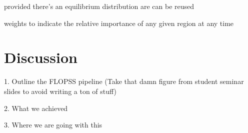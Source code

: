 \documentclass{biophys-new}
\begin{document}
provided there's an equilibrium distribution are can be reused


weights to indicate the relative importance of any given region at any time





\section*{Discussion}

1. Outline the FLOPSS pipeline (Take that damn figure from student seminar slides to avoid writing a ton of stuff)

2. What we achieved

3. Where we are going with this





\end{document}
